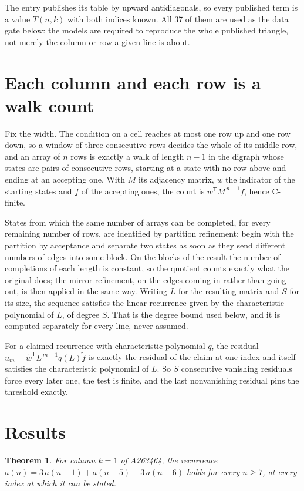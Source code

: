 \documentclass[11pt]{article}
\newtheorem{theorem}{Theorem}
\theoremstyle{definition}
\begin{document}
The entry publishes its table by upward antidiagonals, so every published term is a value $T(n,k)$ with both indices known. All 37 of them are used as the data gate below: the models are required to reproduce the whole published triangle, not merely the column or row a given line is about.

\section{Each column and each row is a walk count}

Fix the width. The condition on a cell reaches at most one row up and one row down, so a window of three consecutive rows decides the whole of its middle row, and an array of $n$ rows is exactly a walk of length $n-1$ in the digraph whose states are pairs of consecutive rows, starting at a state with no row above and ending at an accepting one. With $M$ its adjacency matrix, $w$ the indicator of the starting states and $f$ of the accepting ones, the count is $w^{\mathsf T}M^{\,n-1}f$, hence C-finite.

States from which the same number of arrays can be completed, for every remaining number of rows, are identified by partition refinement: begin with the partition by acceptance and separate two states as soon as they send different numbers of edges into some block. On the blocks of the result the number of completions of each length is constant, so the quotient counts exactly what the original does; the mirror refinement, on the edges coming in rather than going out, is then applied in the same way. Writing $L$ for the resulting matrix and $S$ for its size, the sequence satisfies the linear recurrence given by the characteristic polynomial of $L$, of degree $S$. That is the degree bound used below, and it is computed separately for every line, never assumed.

For a claimed recurrence with characteristic polynomial $q$, the residual $u_m = \tilde w^{\mathsf T}L^{\,m-1}q(L)\tilde f$ is exactly the residual of the claim at one index and itself satisfies the characteristic polynomial of $L$. So $S$ consecutive vanishing residuals force every later one, the test is finite, and the last nonvanishing residual pins the threshold exactly.

\section{Results}

\begin{theorem} For column $k = 1$ of A263464, the recurrence $a(n) = 3\,a(n-1) + a(n-5) - 3\,a(n-6)$ holds for every $n \ge 7$, at every index at which it can be stated.\end{theorem}
\end{document}
